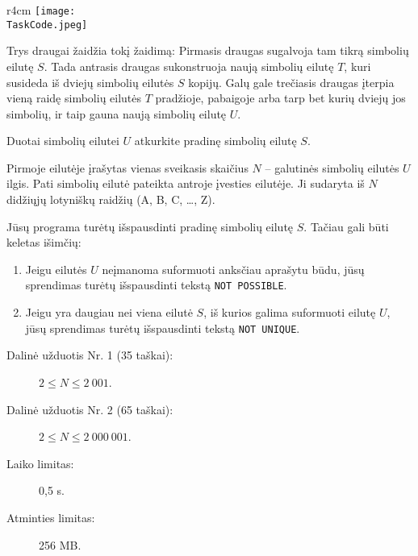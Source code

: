 \documentclass{boi2014-lt}
\renewcommand{\TaskCode}{friends}
\begin{document}
    \begin{wrapfigure}{r}{4cm}
        \vspace{-24pt}
		\texttt{[image: \\TaskCode.jpeg]}
	\end{wrapfigure}
	Trys draugai žaidžia tokį žaidimą:
	Pirmasis draugas sugalvoja tam tikrą simbolių eilutę $S$.
	Tada antrasis draugas sukonstruoja naują simbolių eilutę $T$, kuri susideda
	iš dviejų simbolių eilutės $S$ kopijų.
	Galų gale trečiasis draugas įterpia vieną raidę simbolių eilutės $T$
	pradžioje, pabaigoje arba tarp bet kurių dviejų jos simbolių, ir taip gauna
	naują simbolių eilutę $U$.

    \Task
    Duotai simbolių eilutei $U$ atkurkite pradinę simbolių eilutę $S$.

    \Input
    Pirmoje eilutėje įrašytas vienas sveikasis skaičius $N$ -- galutinės simbolių
    eilutės $U$ ilgis. Pati simbolių eilutė pateikta antroje įvesties eilutėje.
    Ji sudaryta iš $N$ didžiųjų lotyniškų raidžių (A, B, C, \ldots, Z).

    \Output
    Jūsų programa turėtų išspausdinti pradinę simbolių eilutę $S$.
    Tačiau gali būti keletas išimčių:
    \begin{enumerate}
        \item Jeigu eilutės $U$ neįmanoma suformuoti anksčiau aprašytu būdu,
        jūsų sprendimas turėtų išspausdinti tekstą {\tt NOT POSSIBLE}.
        \item Jeigu yra daugiau nei viena eilutė $S$, iš kurios galima
        suformuoti eilutę $U$, jūsų sprendimas turėtų išspausdinti tekstą
        {\tt NOT UNIQUE}.
    \end{enumerate}
    

    \Examples


    \Scoring

    \begin{description}
        \item[Dalinė užduotis Nr. 1 (35 taškai):] $2 \le N \le 2~001$.
        \item[Dalinė užduotis Nr. 2 (65 taškai):] $2 \le N \le 2~000~001$.
    \end{description}

    \Constraints

    \begin{description}
        \item[Laiko limitas:] 0,5 s.
        \item[Atminties limitas:] 256 MB.
    \end{description}
\end{document}
